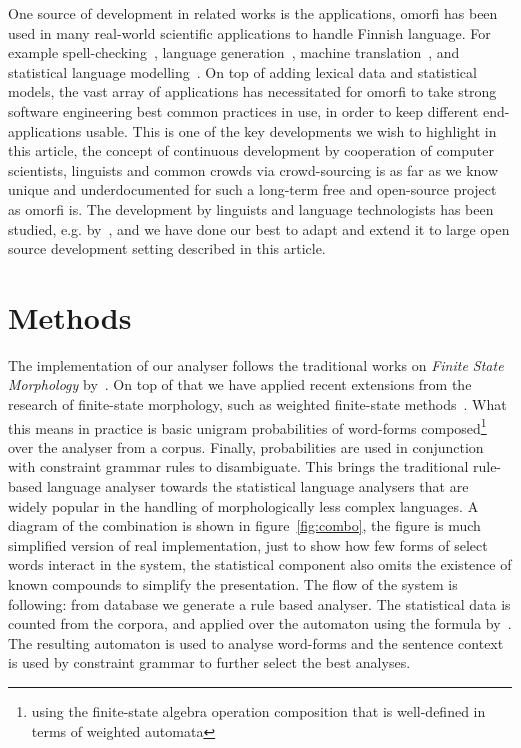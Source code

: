 \documentclass[a4paper,12pt]{article}
\begin{document}
One source of development in related works is the
applications, omorfi has been used in many
real-world scientific applications to handle Finnish
language.  For example
spell-checking~\citep{pirinen2014weighted}, language
generation~\citep{toivanen2012corpus}, machine
translation~\citep{clifton2011combining,rubino2015abumatran},
and statistical language
modelling~\citep{haverinen2013building,bohnet2013joint}.
On top of adding lexical data and statistical
models, the vast array of applications has
necessitated for omorfi to take strong software
engineering best common practices in use, in order
to keep different end-applications usable. This is
one of the key developments we wish to highlight in
this article, the concept of continuous development
by cooperation of computer scientists, linguists and
common crowds via crowd-sourcing is as far as we
know unique and underdocumented for such a long-term
free and open-source project as omorfi is.  The
development by linguists and language technologists
has been studied, e.g. by~\citet{maxwell2008joint},
and we have done our best to adapt and extend it to
large open source development setting described in
this article.




\section{Methods}
\label{sec:methods}

The implementation of our analyser follows the
traditional works on \textit{Finite State
Morphology} by~\citet{beesley2003finite}. On top of
that we have applied recent extensions from the
research of finite-state morphology, such as
weighted finite-state
methods~\citep{openfst,hfst2012}. What this means in
practice is basic unigram probabilities of
word-forms composed\footnote{using the finite-state
algebra operation composition that is well-defined
in terms of weighted automata} over the analyser
from a corpus.  Finally, probabilities are used in
conjunction with constraint grammar rules to
disambiguate.  This brings the traditional
rule-based language analyser towards the statistical
language analysers that are widely popular in the
handling of morphologically less complex languages.
A diagram of the combination is shown in
figure~\ref{fig:combo}, the figure is much
simplified version of real implementation, just to
show how few forms of select words interact in the
system, the statistical component also omits the
existence of known compounds to simplify the
presentation. The flow of the system is following:
from database we generate a rule based analyser. The
statistical data is counted from the corpora, and
applied over the automaton using the formula
by~\cite{pirinen2009weighted}. The resulting
automaton is used to analyse word-forms and the
sentence context is used by constraint grammar to
further select the best analyses.
\end{document}
